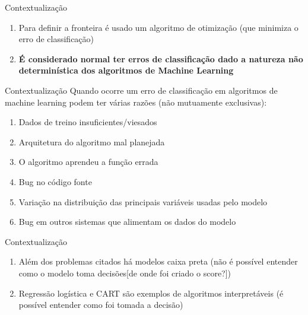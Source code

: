 \begin{frame}
	\begin{block}{Contextualização}
		\begin{enumerate}
			\item Para definir a fronteira é usado um algoritmo de otimização (que minimiza o erro de classificação)
			\item \textbf{É considerado normal ter erros de classificação dado a natureza não determinística dos algoritmos de Machine Learning}
		\end{enumerate}
	\end{block}
\end{frame}

\begin{frame}
	\begin{block}{Contextualização}
	Quando ocorre um erro de classificação em algoritmos de machine learning podem ter várias razões (não mutuamente exclusivas):
		\begin{enumerate}
					\item Dados de treino insuficientes/viesados
					\item Arquitetura do algoritmo mal planejada
					\item O algoritmo aprendeu a função errada
					\item Bug no código fonte
					\item Variação na distribuição das principais variáveis usadas pelo modelo
					\item Bug em outros sistemas que alimentam os dados do modelo
		\end{enumerate}
	\end{block}
\end{frame}



\begin{frame}
	\begin{block}{Contextualização}
		\begin{enumerate}
			\item Além dos problemas citados há modelos caixa preta (não é possível entender como o modelo toma decisões[de onde foi criado o score?])
			\item Regressão logística e CART são exemplos de algoritmos interpretáveis (é possível entender como foi tomada a decisão)
		\end{enumerate}
	\end{block}
\end{frame}



